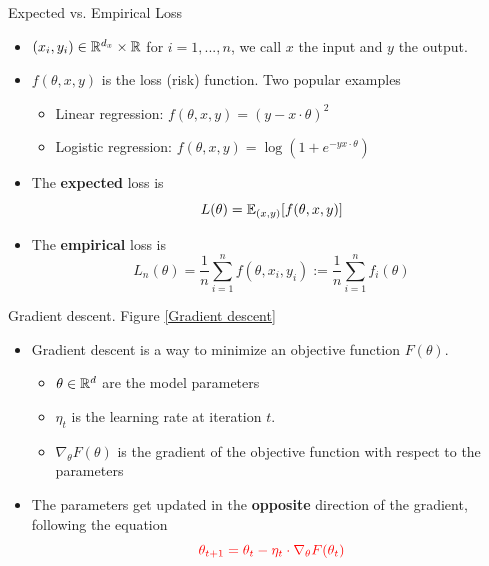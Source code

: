 \documentclass[english]{article}
\begin{document}
\item {Expected vs. Empirical Loss}
\begin{itemize}
\item $(x_i, y_i) \in \mathbb{R}^{d_x} \times \mathbb{R}$ for $i = 1,..., n$, we call $x$ the input and $y$ the output. 
\item $f(\theta, x, y)$ is the loss (risk) function. Two popular examples
\begin{itemize}
\item Linear regression: $f(\theta, x, y) = (y - x\cdot\theta)^2$ 
\item Logistic regression: $f(\theta, x, y) = \log(1+e^{-y x \cdot\theta})$
\end{itemize} 


\item The \textbf{expected} loss is
$$L(\theta) = \mathbb{E}_{(x, y)}[f(\theta, x, y)]$$ 


\item The \textbf{empirical} loss is
$$L_n(\theta) = \frac1n \sum_{i=1}^n f(\theta, x_i, y_i) := \frac1n \sum_{i=1}^n f_i(\theta)$$
\end{itemize}








\item {Gradient descent}. Figure \ref{Gradient descent}
\begin{itemize}
\item Gradient descent is a way to minimize an objective function $F(\theta)$. 
\begin{itemize}
\item $\theta \in \mathbb{R}^d$ are the model parameters
\item $\eta_t$ is the learning rate at iteration $t$.
\item $\nabla_\theta F(\theta)$ is the gradient of the objective function with respect to the parameters 
\end{itemize}

\item The parameters get updated in the \textbf{opposite} direction of the gradient, following the equation $$\textcolor{red}{\theta_{t+1} = \theta_t - \eta_t \cdot \nabla_\theta F(\theta_t)}$$
 

\end{itemize}
\end{document}

